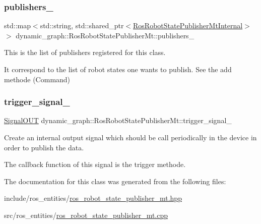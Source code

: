 \subsubsection{\texorpdfstring{publishers\+\_\+}{publishers\_}}
{\footnotesize\ttfamily std\+::map$<$std\+::string, std\+::shared\+\_\+ptr$<$\hyperlink{structdynamic__graph_1_1RosRobotStatePublisherMtInternal}{Ros\+Robot\+State\+Publisher\+Mt\+Internal}$>$ $>$ dynamic\+\_\+graph\+::\+Ros\+Robot\+State\+Publisher\+Mt\+::publishers\+\_\+\hspace{0.3cm}{\ttfamily [private]}}



This is the list of publishers registered for this class. 

It correspond to the list of robot states one wants to publish. See the add methode (Command) \mbox{\label{classdynamic__graph_1_1RosRobotStatePublisherMt_af44e1e178bd62374b9b77a630d66ae71}} 
\subsubsection{\texorpdfstring{trigger\+\_\+signal\+\_\+}{trigger\_signal\_}}
{\footnotesize\ttfamily \hyperlink{namespacedynamic__graph_a9d80c350c95e161319d7a6e629ecdc4b}{Signal\+O\+UT} dynamic\+\_\+graph\+::\+Ros\+Robot\+State\+Publisher\+Mt\+::trigger\+\_\+signal\+\_\+\hspace{0.3cm}{\ttfamily [private]}}



Create an internal output signal which should be call periodically in the device in order to publish the data. 

The callback function of this signal is the trigger methode. 

The documentation for this class was generated from the following files\+:\begin{DoxyCompactItemize}
\item 
include/ros\+\_\+entities/\hyperlink{ros__robot__state__publisher__mt_8hpp}{ros\+\_\+robot\+\_\+state\+\_\+publisher\+\_\+mt.\+hpp}\item 
src/ros\+\_\+entities/\hyperlink{ros__robot__state__publisher__mt_8cpp}{ros\+\_\+robot\+\_\+state\+\_\+publisher\+\_\+mt.\+cpp}\end{DoxyCompactItemize}
